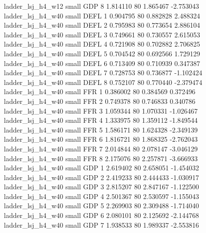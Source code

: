        ladder_lsj_h4_w12      small      GDP                 8 1.814110 80       1.865467          -2.753043
       ladder_lsj_h4_w40      small     DEFL                 1 0.904795 80       0.882828           2.488324
       ladder_lsj_h4_w40      small     DEFL                 2 0.795983 80       0.773654           2.886104
       ladder_lsj_h4_w40      small     DEFL                 3 0.749661 80       0.730557           2.615053
       ladder_lsj_h4_w40      small     DEFL                 4 0.721908 80       0.702882           2.706825
       ladder_lsj_h4_w40      small     DEFL                 5 0.704542 80       0.692566           1.729129
       ladder_lsj_h4_w40      small     DEFL                 6 0.713409 80       0.710939           0.347387
       ladder_lsj_h4_w40      small     DEFL                 7 0.728753 80       0.736877          -1.102424
       ladder_lsj_h4_w40      small     DEFL                 8 0.752107 80       0.770440          -2.379474
       ladder_lsj_h4_w40      small      FFR                 1 0.386002 80       0.384569           0.372496
       ladder_lsj_h4_w40      small      FFR                 2 0.749378 80       0.746833           0.340786
       ladder_lsj_h4_w40      small      FFR                 3 1.059344 80       1.070331          -1.026467
       ladder_lsj_h4_w40      small      FFR                 4 1.333975 80       1.359112          -1.849544
       ladder_lsj_h4_w40      small      FFR                 5 1.586171 80       1.624328          -2.349139
       ladder_lsj_h4_w40      small      FFR                 6 1.816721 80       1.868325          -2.762043
       ladder_lsj_h4_w40      small      FFR                 7 2.014844 80       2.078147          -3.046129
       ladder_lsj_h4_w40      small      FFR                 8 2.175076 80       2.257871          -3.666933
       ladder_lsj_h4_w40      small      GDP                 1 2.619402 80       2.658051          -1.454032
       ladder_lsj_h4_w40      small      GDP                 2 2.419233 80       2.444433          -1.030917
       ladder_lsj_h4_w40      small      GDP                 3 2.815207 80       2.847167          -1.122500
       ladder_lsj_h4_w40      small      GDP                 4 2.501367 80       2.530597          -1.155043
       ladder_lsj_h4_w40      small      GDP                 5 2.269903 80       2.309488          -1.714040
       ladder_lsj_h4_w40      small      GDP                 6 2.080101 80       2.125692          -2.144768
       ladder_lsj_h4_w40      small      GDP                 7 1.938533 80       1.989337          -2.553816
